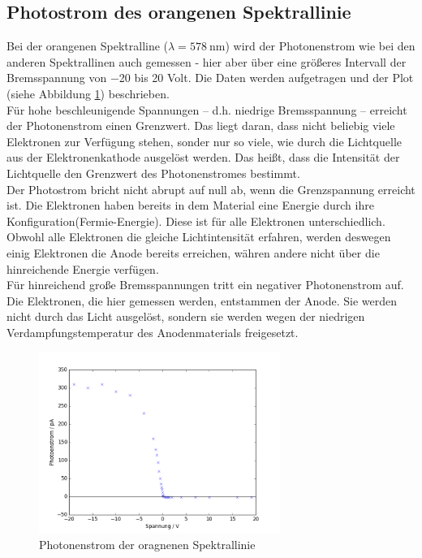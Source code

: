 \subsection{Photostrom des orangenen Spektrallinie}
Bei der orangenen Spektralline ($\lambda = \SI{578}{\nano\meter}$) wird der Photonenstrom wie bei den anderen Spektrallinen auch gemessen - hier aber über eine größeres Intervall der Bremsspannung von  \num{-20} bis \num{20} Volt. Die Daten werden aufgetragen und der Plot (siehe Abbildung \ref{fig:orange}) beschrieben. \\
Für hohe beschleunigende Spannungen -- d.h. niedrige Bremsspannung -- erreicht der Photonenstrom einen Grenzwert. Das liegt daran, dass nicht beliebig viele Elektronen zur Verfügung stehen, sonder nur so viele, wie durch die Lichtquelle aus der Elektronenkathode ausgelöst werden. Das heißt, dass die Intensität der Lichtquelle den Grenzwert des Photonenstromes bestimmt. \\
Der Photostrom bricht nicht abrupt auf null ab, wenn die Grenzspannung erreicht ist. Die Elektronen haben bereits in dem Material eine Energie durch ihre Konfiguration(Fermie-Energie). Diese ist für alle Elektronen unterschiedlich. Obwohl alle Elektronen die gleiche Lichtintensität erfahren, werden deswegen einig Elektronen die Anode bereits erreichen, währen andere nicht über die hinreichende Energie verfügen. \\
Für hinreichend große Bremsspannungen tritt ein negativer Photonenstrom auf. Die Elektronen, die hier gemessen werden, entstammen der Anode. Sie werden nicht durch das Licht ausgelöst, sondern sie werden wegen der niedrigen Verdampfungstemperatur des Anodenmaterials freigesetzt.

\begin{figure}[h!]
	\centering
	\includegraphics[width=0.7\textwidth]{build/OrangeWellenlange.png}
	\caption{Photonenstrom der oragnenen Spektrallinie}
	\label{fig:orange}
\end{figure}

	

